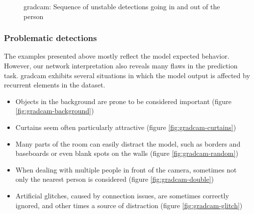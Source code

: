 \begin{figure}[!h]
\begin{center}
\begin{subfigure}[h]{0.24\textwidth}
		\end{subfigure}
	\end{center}
	\vspace{-0.5cm}
	\caption[\gls{gradcam}: Sequence of unstable detections going in and out of the person]{\gls{gradcam}: Sequence of unstable detections going in and out of the person}
	\label{fig:gradcam-seq-beard}
\end{figure}

\subsubsection*{Problematic detections}

The examples presented above mostly reflect the model expected behavior. However, our network interpretation also reveals many flaws in the prediction task. \gls{gradcam} exhibits several situations in which the model output is affected by recurrent elements in the dataset.

\begin{itemize}
	\item Objects in the background are prone to be considered important (figure \ref{fig:gradcam-background})
	\item Curtains seem often particularly attractive (figure \ref{fig:gradcam-curtains})
	\item Many parts of the room can easily distract the model, such as borders and baseboards or even blank spots on the walls (figure \ref{fig:gradcam-random})
	\item When dealing with multiple people in front of the camera, sometimes not only the nearest person is considered (figure \ref{fig:gradcam-double})
	\item Artificial glitches, caused by connection issues, are sometimes correctly ignored, and other times a source of distraction (figure \ref{fig:gradcam-glitch})
\end{itemize}


